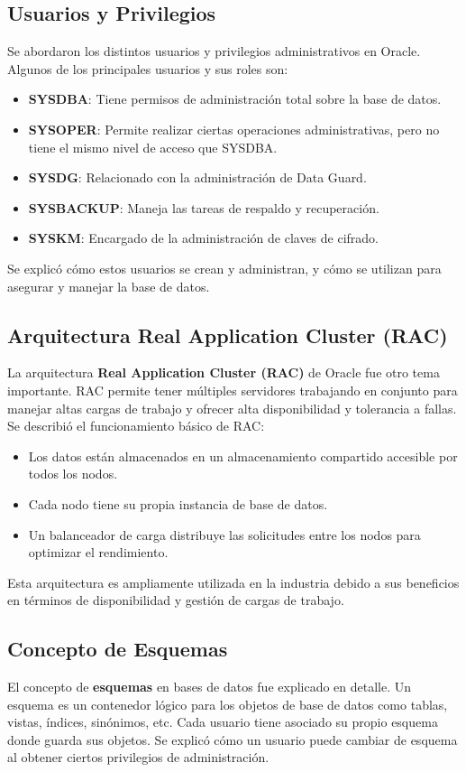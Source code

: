 \documentclass[12pt]{article}
\begin{document}
\subsection*{Usuarios y Privilegios}
Se abordaron los distintos usuarios y privilegios administrativos en Oracle. Algunos de los principales usuarios y sus roles son:
\begin{itemize}
    \item \textbf{SYSDBA}: Tiene permisos de administración total sobre la base de datos.
    \item \textbf{SYSOPER}: Permite realizar ciertas operaciones administrativas, pero no tiene el mismo nivel de acceso que SYSDBA.
    \item \textbf{SYSDG}: Relacionado con la administración de Data Guard.
    \item \textbf{SYSBACKUP}: Maneja las tareas de respaldo y recuperación.
    \item \textbf{SYSKM}: Encargado de la administración de claves de cifrado.
\end{itemize}
Se explicó cómo estos usuarios se crean y administran, y cómo se utilizan para asegurar y manejar la base de datos.

\subsection*{Arquitectura Real Application Cluster (RAC)}
La arquitectura \textbf{Real Application Cluster (RAC)} de Oracle fue otro tema importante. RAC permite tener múltiples servidores trabajando en conjunto para manejar altas cargas de trabajo y ofrecer alta disponibilidad y tolerancia a fallas. Se describió el funcionamiento básico de RAC:
\begin{itemize}
    \item Los datos están almacenados en un almacenamiento compartido accesible por todos los nodos.
    \item Cada nodo tiene su propia instancia de base de datos.
    \item Un balanceador de carga distribuye las solicitudes entre los nodos para optimizar el rendimiento.
\end{itemize}
Esta arquitectura es ampliamente utilizada en la industria debido a sus beneficios en términos de disponibilidad y gestión de cargas de trabajo.

\subsection*{Concepto de Esquemas}
El concepto de \textbf{esquemas} en bases de datos fue explicado en detalle. Un esquema es un contenedor lógico para los objetos de base de datos como tablas, vistas, índices, sinónimos, etc. Cada usuario tiene asociado su propio esquema donde guarda sus objetos. Se explicó cómo un usuario puede cambiar de esquema al obtener ciertos privilegios de administración.
\end{document}
